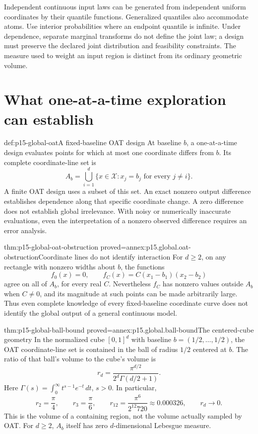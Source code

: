 Independent continuous input laws can be generated from independent
uniform coordinates by their quantile functions. Generalized quantiles
also accommodate atoms. Use interior probabilities where an endpoint
quantile is infinite. Under dependence, separate marginal transforms
do not define the joint law; a design must preserve the declared joint
distribution and feasibility constraints.
The measure used to weight an input region is distinct from its ordinary
geometric volume.

\section{What one-at-a-time exploration can establish}

\begin{hbdefinition}{def:p15-global-oat}{A fixed-baseline OAT design}
At baseline \(b\), a one-at-a-time design evaluates points for which
at most one coordinate differs from \(b\).
Its complete coordinate-line set is
\[
 A_b=\bigcup_{i=1}^d
 \{x\in\mathcal X:x_j=b_j\text{ for every }j\ne i\}.
\]
A finite OAT design uses a subset of this set.
An exact nonzero output difference establishes dependence along that
specific coordinate change. A zero difference does not establish
global irrelevance. With noisy or numerically inaccurate evaluations,
even the interpretation of a nonzero observed difference requires
an error analysis.
\end{hbdefinition}

\begin{hbtheorem}{thm:p15-global-oat-obstruction}
 {proved=annex:p15.global.oat-obstruction}{Coordinate lines do not identify interaction}
For \(d\geq2\), on any rectangle with nonzero widths about \(b\), the
functions
\[
 f_0(x)=0,\qquad f_C(x)=C(x_1-b_1)(x_2-b_2)
\]
agree on all of \(A_b\), for every real \(C\).
Nevertheless \(f_C\) has nonzero values outside \(A_b\)
when \(C\ne0\), and its magnitude at such points can be made arbitrarily large.
Thus even complete knowledge of every fixed-baseline coordinate curve
does not identify the global output of a general continuous model.
\end{hbtheorem}

\begin{hbtheorem}{thm:p15-global-ball-bound}
 {proved=annex:p15.global.ball-bound}{The centered-cube geometry}
In the normalized cube \([0,1]^d\) with baseline
\(b=(1/2,\ldots,1/2)\), the OAT coordinate-line set is contained in the
ball of radius \(1/2\) centered at \(b\).
The ratio of that ball's volume to the cube's volume is
\[
 r_d=\frac{\pi^{d/2}}{2^d\Gamma(d/2+1)}.
\]
Here \(\Gamma(s)=\int_0^\infty t^{s-1}e^{-t}\,dt\), \(s>0\).
In particular,
\[
 r_2=\frac{\pi}{4},\qquad r_3=\frac{\pi}{6},\qquad
 r_{12}=\frac{\pi^6}{2^{12}720}\approx0.000326,
 \qquad r_d\longrightarrow0.
\]
This is the volume of a containing region, not the volume actually
sampled by OAT. For \(d\geq2\), \(A_b\) itself has zero \(d\)-dimensional
Lebesgue measure.
\end{hbtheorem}

